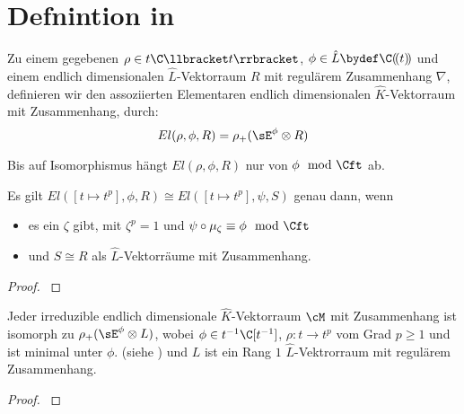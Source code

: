 \section{Defnintion in \cite{sabbah_Fourier-local}}
\begin{defn}
\cite[Def 2.1]{sabbah_Fourier-local}
\begin{comment}
Alternative. ausfürlichere / komplexe definition \cite[Def 5.4.5.]{sabbah_cimpa90}
\end{comment}
Zu einem gegebenen $\rho\in t\C\llbracket t\rrbracket$, $\phi\in \hat L \bydef
\C(\!(t)\!)$ und einem endlich dimensionalen $\hat L$-Vektorraum $R$ mit
regulärem Zusammenhang $\nabla$, definieren wir den assoziierten Elementaren
endlich dimensionalen $\hat K$-Vektorraum mit Zusammenhang, durch:
\[
El(\rho,\phi,R)=\rho_+(\sE^\phi\otimes R)
\]
\end{defn}
\cite[nach Def 2.1]{sabbah_Fourier-local}
Bis auf Isomorphismus hängt $El(\rho,\phi,R)$ nur von $\phi\mod\Cft$ ab.
\begin{lem}
\cite[Lem 2.2]{sabbah_Fourier-local}
\end{lem}
\begin{lem} \cite[Lem 2.6.]{sabbah_Fourier-local}
Es gilt $El([t\mapsto t^p],\phi,R)\cong El([t\mapsto t^p],\psi,S)$ genau dann,
wenn
\begin{itemize}
\item es ein $\zeta$ gibt, mit $\zeta^p=1$ und
$\psi\circ\mu_\zeta\equiv\phi\mod\Cft$
\item und $S\cong R$ als $\hat L$-Vektorräume mit Zusammenhang.
\end{itemize}
\end{lem}
\begin{proof}
\cite[Lem 2.6.]{sabbah_Fourier-local}
\end{proof}
%
\begin{prop} \cite[Prop 3.1]{sabbah_Fourier-local}
Jeder irreduzible endlich dimensionale $\hat K$-Vektorraum $\cM$ mit
Zusammenhang ist isomorph zu $\rho_+(\sE^\phi\otimes L)$, wobei $\phi\in
t^{-1}\C[t^{-1}]$, $\rho:t\rightarrow t^p$ vom Grad $p\geq 1$ und ist minimal
unter $\phi$. (siehe \cite[Rem  2.8]{sabbah_Fourier-local}) und $L$ ist ein
Rang $1$ $\hat L$-Vektrorraum mit regulärem Zusammenhang.
\end{prop}
\begin{proof}
\cite[Prop 3.1]{sabbah_Fourier-local}
\end{proof}

